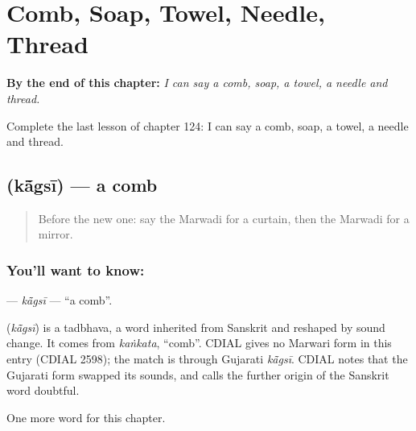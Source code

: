 
\chapter{Comb, Soap, Towel, Needle, Thread}
\label{ch:mw-comb-soap-towel-needle-thread}

\begin{chapteropening}
\textbf{By the end of this chapter:} \emph{I can say a comb, soap, a towel, a needle and thread.}

Complete the last lesson of chapter 124: I can say a comb, soap, a towel, a needle and thread.
\end{chapteropening}

\section[\texorpdfstring{\mw{कांगसी} (kā̃gsī)}{कांगसी (kā̃gsī)}]{ (kā̃gsī) — a comb}

\label{lesson:MW-C124-kagsi}



\begin{quote}
Before the new one: say the Marwadi for a curtain, then the Marwadi for a mirror.
\end{quote}

\subsection*{You'll want to know: }
\textbf{} — \emph{kā̃gsī} — \textquotedblleft{}a comb\textquotedblright{}.

\begin{cousinweb}
\textbf{} (\emph{kā̃gsī}) is a tadbhava, a word inherited from Sanskrit and reshaped by sound change. It comes from \emph{kaṅkata}, \textquotedblleft{}comb\textquotedblright{}. CDIAL gives no Marwari form in this entry (CDIAL 2598); the match is through Gujarati \emph{kā̃gsī}. CDIAL notes that the Gujarati form swapped its sounds, and calls the further origin of the Sanskrit word doubtful.
\end{cousinweb}

\begin{grammarlens}[title={What you've built}]
One more word for this chapter.
\end{grammarlens}

